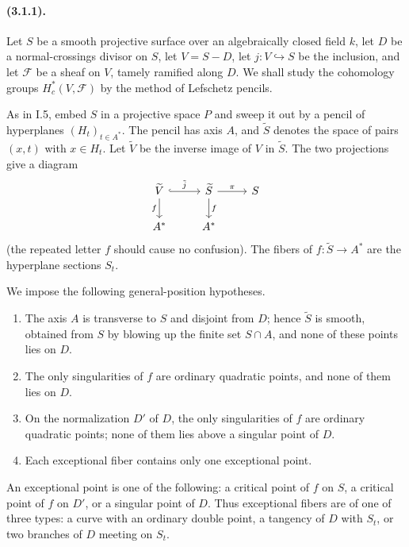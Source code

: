 \documentclass[11pt]{article}
\theoremstyle{remark}
\begin{document}
\paragraph{(3.1.1).}
Let $S$ be a smooth projective surface over an algebraically closed field $k$, let $D$ be a normal-crossings divisor on $S$, let $V=S-D$, let $j:V\hookrightarrow S$ be the inclusion, and let $\mathcal F$ be a sheaf on $V$, tamely ramified along $D$. We shall study the cohomology groups $H^*_c(V,\mathcal F)$ by the method of Lefschetz pencils.

As in I.5, embed $S$ in a projective space $P$ and sweep it out by a pencil of hyperplanes $(H_t)_{t\in A^*}$. The pencil has axis $A$, and $\widetilde S$ denotes the space of pairs $(x,t)$ with $x\in H_t$. Let $\widetilde V$ be the inverse image of $V$ in $\widetilde S$. The two projections give a diagram
\[
\begin{tikzcd}
\widetilde V \arrow[r,hook,"\tilde j"] \arrow[d,"f"'] & \widetilde S \arrow[d,"f"] \arrow[r,"\pi"] & S\\
A^* & A^* & {}
\end{tikzcd}
\]
(the repeated letter $f$ should cause no confusion). The fibers of $f:\widetilde S\to A^*$ are the hyperplane sections $S_t$.

We impose the following general-position hypotheses.
\begin{enumerate}[label=(\Alph*)]
\item The axis $A$ is transverse to $S$ and disjoint from $D$; hence $\widetilde S$ is smooth, obtained from $S$ by blowing up the finite set $S\cap A$, and none of these points lies on $D$.
\item The only singularities of $f$ are ordinary quadratic points, and none of them lies on $D$.
\item On the normalization $D'$ of $D$, the only singularities of $f$ are ordinary quadratic points; none of them lies above a singular point of $D$.
\item Each exceptional fiber contains only one exceptional point.
\end{enumerate}
An exceptional point is one of the following: a critical point of $f$ on $S$, a critical point of $f$ on $D'$, or a singular point of $D$. Thus exceptional fibers are of one of three types: a curve with an ordinary double point, a tangency of $D$ with $S_t$, or two branches of $D$ meeting on $S_t$.
\end{document}
